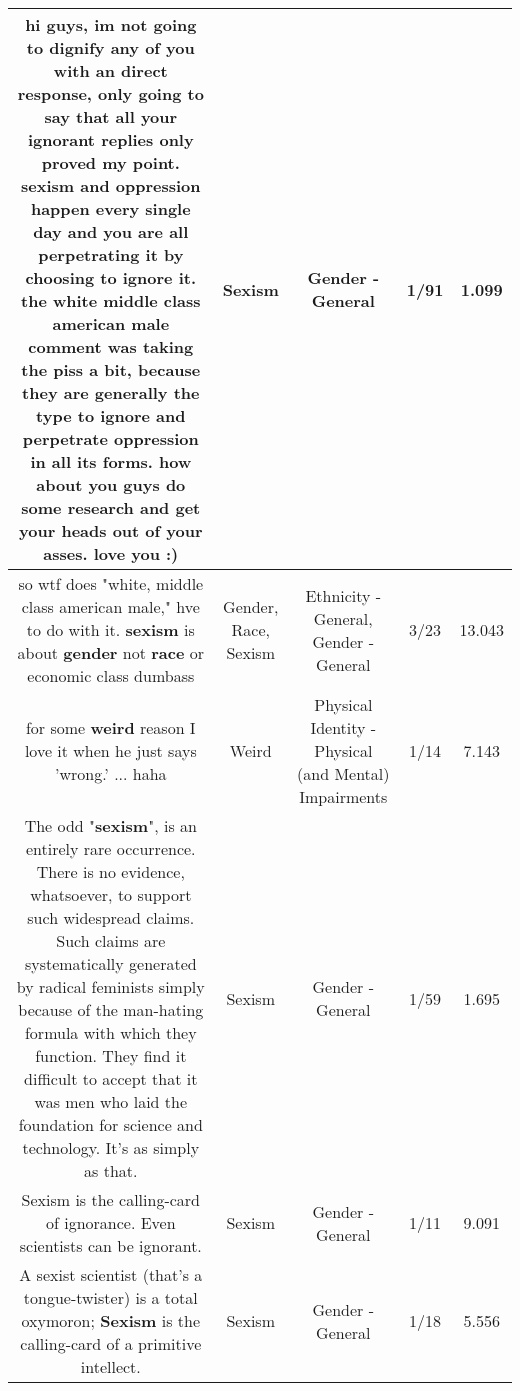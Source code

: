 \documentclass[11pt]{article}
\newlength\mylength
\begin{document}
\begin{center}
\begin{longtable}{|C{.65\mylength}|C{.30\mylength}|C{.12\mylength}|C{.12\mylength}|C{.12\mylength}|}
  \small hi guys, im not going to dignify any of you with an direct response, only going to say that all your ignorant replies only proved my point. \textbf{sexism} and oppression happen every single day and you are all perpetrating it by choosing to ignore it. the white middle class american male comment was taking the piss a bit, because they are generally the type to ignore and perpetrate oppression in all its forms. how about you guys do some research and get your heads out of your asses. love you :)\normalsize   & Sexism & Gender - General & 1/91 & 1.099 \\  \hline
  \small so wtf does "white, middle class american male," hve to do with it. \textbf{sexism} is about \textbf{gender} not \textbf{race} or economic class dumbass\normalsize   & Gender, Race, Sexism & Ethnicity - General, Gender - General & 3/23 & 13.043 \\  \hline
  \small for some \textbf{weird} reason I love it when he just says 'wrong.' ... haha\normalsize   & Weird & Physical Identity - Physical (and Mental) Impairments & 1/14 & 7.143 \\  \hline
  \small The odd "\textbf{sexism}", is an entirely rare occurrence. There is no evidence, whatsoever, to support such widespread claims. Such claims are systematically generated by radical feminists simply because of the man-hating formula with which they function. They find it difficult to accept that it was men who laid the foundation for science and technology. It's as simply as that.\normalsize   & Sexism & Gender - General & 1/59 & 1.695 \\  \hline
  \small Sexism is the calling-card of ignorance. Even scientists can be ignorant.\normalsize   & Sexism & Gender - General & 1/11 & 9.091 \\  \hline
  \small A sexist scientist (that's a tongue-twister) is a total oxymoron; \textbf{Sexism} is the calling-card of a primitive intellect.\normalsize   & Sexism & Gender - General & 1/18 & 5.556 \\  \hline

\end{longtable}
\end{center}
\end{document}
